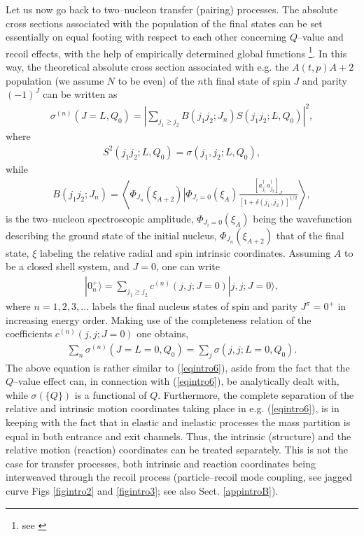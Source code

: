 Let us now go back to two--nucleon transfer (pairing) processes. The  absolute cross sections associated with the population of the final states can be set essentially on equal footing with respect to each other  concerning  $Q$--value and recoil effects, with the help of empirically determined global functions \footnote{see \cite{Broglia:72b}}. In this way, the theoretical absolute cross section associated with e.g. the $A(t,p)A+2$ population (we assume $N$ to be even) of the $n$th final state of spin $J$ and parity $(-1)^J$ can be written as 
\begin{align}
\sigma^{(n)}(J=L,Q_0)=\left|\sum_{j_1\geq j_2}B(j_1 j_2;J_n)S(j_1 j_2 ;L,Q_0)\right|^2,
\end{align}
where
\begin{align}
S^2(j_1 j_2 ;L,Q_0)=\sigma(j_1,j_2;L,Q_0),
\end{align}
while
\begin{align}
B(j_1j_2;J_n)=\left\langle \Phi_{J_n}(\xi_{A+2})\left|\Phi_{J_i=0}(\xi_A)\right.\frac{\left[a^\dagger_{j_1}a^\dagger_{j_2}\right]_J}{\left[1+\delta(j_1,j_2)\right]^{1/2}}\right\rangle,
\end{align}
is the two--nucleon spectroscopic amplitude, $\Phi_{J_i=0}(\xi_A)$ being the wavefunction describing the ground state of the initial nucleus, $\Phi_{J_n}(\xi_{A+2})$ that of the final state, $\xi$ labeling the relative radial and spin intrinsic coordinates. Assuming $A$ to be a closed shell system, and $J=0$, one can write
\begin{align}
|0^+_n\rangle=\sum_{j_1\geq j_2}c^{(n)}(j,j;J=0)|j,j;J=0\rangle,
\end{align}
where $n=1,2,3,\dots$ labels the final nucleus states of spin and parity $J^\pi=0^+$ in increasing energy order. Making use of the completeness relation of the coefficients $c^{(n)}(j,j;J=0)$ one obtains,
\begin{align}\label{eqintro12}
\sum_n \sigma^{(n)}(J=L=0,Q_0)=\sum_j\sigma(j,j;L=0,Q_0).
\end{align}
The above equation is rather similar to (\ref{eqintro6}), aside from the fact that the $Q$--value effect can, in connection with (\ref{eqintro6}),  be analytically dealt with, while $\sigma(\{Q\})$ is a functional of $Q$. Furthermore, the complete separation of the relative and intrinsic motion coordinates taking place in e.g. (\ref{eqintro6}), is in keeping with the fact that in elastic and inelastic processes the mass partition is equal in both entrance and exit channels. Thus, the intrinsic (structure) and the relative motion (reaction) coordinates can be treated separately. This is not the case for transfer processes, both intrinsic and reaction coordinates being interweaved through the recoil process (particle--recoil mode coupling, see jagged curve Figs \ref{figintro2} and \ref{figintro3}; see also Sect. \ref{appintroB}). 





